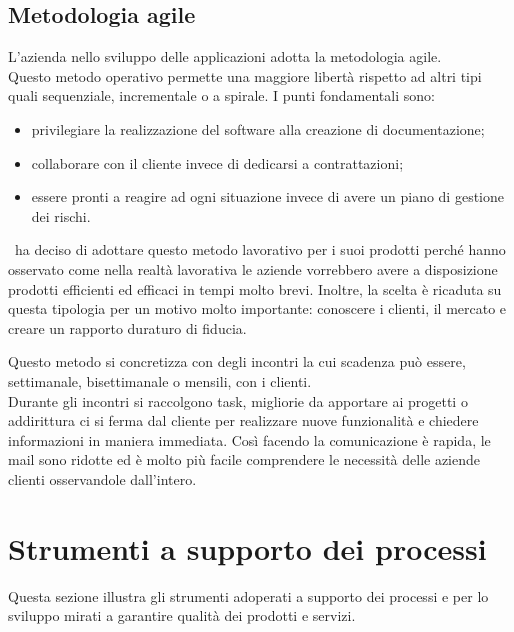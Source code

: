 
\subsection{Metodologia agile}
\label{cap1:Metodologia agile}

L'azienda nello sviluppo delle applicazioni adotta la metodologia agile. \\
Questo metodo operativo permette una maggiore libertà rispetto ad altri tipi quali sequenziale, incrementale o a spirale. I punti fondamentali sono:
\begin{itemize}
	\item privilegiare la realizzazione del software alla creazione di documentazione;
	\item collaborare con il cliente invece di dedicarsi a contrattazioni;
	\item essere pronti a reagire ad ogni situazione invece di avere un piano di gestione dei rischi.
\end{itemize}
\azienda\ ha deciso di adottare questo metodo lavorativo per i suoi prodotti perché hanno osservato come nella realtà lavorativa le aziende vorrebbero avere a disposizione prodotti efficienti ed efficaci in tempi molto brevi. 
Inoltre, la scelta è ricaduta su questa tipologia per un motivo molto importante: conoscere i clienti, il mercato e creare un rapporto duraturo di fiducia. 

Questo metodo si concretizza con degli incontri la cui scadenza può essere, settimanale, bisettimanale o mensili, con i clienti.\\
Durante gli incontri si raccolgono task, migliorie da apportare ai progetti o addirittura ci si ferma dal cliente per realizzare nuove funzionalità e chiedere informazioni in maniera immediata. Così facendo la comunicazione è rapida, le mail sono ridotte ed è molto più facile comprendere le necessità delle aziende clienti osservandole dall'intero.


\section{Strumenti a supporto dei processi}
\label{cap1:Strumenti a supporto dei processi}
Questa sezione illustra gli strumenti adoperati a supporto dei processi e per lo sviluppo mirati a garantire qualità dei prodotti e servizi.

